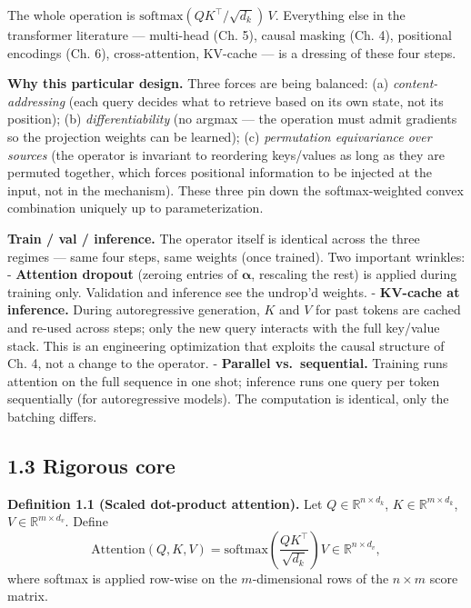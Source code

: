 \documentclass[
]{article}
\begin{document}
The whole operation is \(\text{softmax}(QK^\top / \sqrt{d_k})\, V\).
Everything else in the transformer literature --- multi-head (Ch. 5),
causal masking (Ch. 4), positional encodings (Ch. 6), cross-attention,
KV-cache --- is a dressing of these four steps.

\textbf{Why this particular design.} Three forces are being balanced:
(a) \emph{content-addressing} (each query decides what to retrieve based
on its own state, not its position); (b) \emph{differentiability} (no
argmax --- the operation must admit gradients so the projection weights
can be learned); (c) \emph{permutation equivariance over sources} (the
operator is invariant to reordering keys/values as long as they are
permuted together, which forces positional information to be injected at
the input, not in the mechanism). These three pin down the
softmax-weighted convex combination uniquely up to parameterization.

\textbf{Train / val / inference.} The operator itself is identical
across the three regimes --- same four steps, same weights (once
trained). Two important wrinkles: - \textbf{Attention dropout} (zeroing
entries of \(\boldsymbol{\alpha}\), rescaling the rest) is applied
during training only. Validation and inference see the undrop'd weights.
- \textbf{KV-cache at inference.} During autoregressive generation,
\(K\) and \(V\) for past tokens are cached and re-used across steps;
only the new query interacts with the full key/value stack. This is an
engineering optimization that exploits the causal structure of Ch. 4,
not a change to the operator. - \textbf{Parallel vs.~sequential.}
Training runs attention on the full sequence in one shot; inference runs
one query per token sequentially (for autoregressive models). The
computation is identical, only the batching differs.

\hypertarget{rigorous-core}{%
\subsection{1.3 Rigorous core}\label{rigorous-core}}

\textbf{Definition 1.1 (Scaled dot-product attention).} Let
\(Q \in \mathbb{R}^{n \times d_k}\),
\(K \in \mathbb{R}^{m \times d_k}\),
\(V \in \mathbb{R}^{m \times d_v}\). Define
\[\text{Attention}(Q, K, V) = \text{softmax}\!\left( \frac{QK^\top}{\sqrt{d_k}} \right) V \in \mathbb{R}^{n \times d_v},\]
where softmax is applied row-wise on the \(m\)-dimensional rows of the
\(n \times m\) score matrix.
\end{document}
